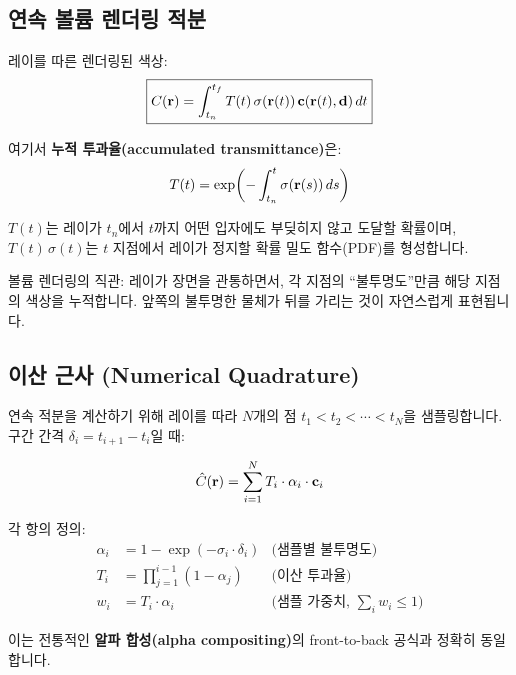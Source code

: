 \documentclass[11pt, a4paper]{report}
\begin{document}
\subsection{연속 볼륨 렌더링 적분}

레이를 따른 렌더링된 색상:
\begin{equation}
\boxed{
C(\mathbf{r}) = \int_{t_n}^{t_f} T(t)\, \sigma(\mathbf{r}(t))\, \mathbf{c}(\mathbf{r}(t), \mathbf{d})\, dt
}
\label{eq:volume_rendering}
\end{equation}

여기서 \textbf{누적 투과율(accumulated transmittance)}은:
\begin{equation}
T(t) = \exp\!\left( -\int_{t_n}^{t} \sigma(\mathbf{r}(s))\, ds \right)
\label{eq:transmittance}
\end{equation}

$T(t)$는 레이가 $t_n$에서 $t$까지 어떤 입자에도 부딪히지 않고 도달할 확률이며, $T(t)\,\sigma(t)$는 $t$ 지점에서 레이가 정지할 확률 밀도 함수(PDF)를 형성합니다.

\begin{keyidea}
볼륨 렌더링의 직관: 레이가 장면을 관통하면서, 각 지점의 ``불투명도''만큼 해당 지점의 색상을 누적합니다. 앞쪽의 불투명한 물체가 뒤를 가리는 것이 자연스럽게 표현됩니다.
\end{keyidea}

\subsection{이산 근사 (Numerical Quadrature)}

연속 적분을 계산하기 위해 레이를 따라 $N$개의 점 $t_1 < t_2 < \cdots < t_N$을 샘플링합니다. 구간 간격 $\delta_i = t_{i+1} - t_i$일 때:

\begin{equation}
\hat{C}(\mathbf{r}) = \sum_{i=1}^{N} T_i \cdot \alpha_i \cdot \mathbf{c}_i
\label{eq:discrete_rendering}
\end{equation}

각 항의 정의:
\begin{align}
\alpha_i &= 1 - \exp(-\sigma_i \cdot \delta_i) & \text{(샘플별 불투명도)} \label{eq:alpha} \\
T_i &= \prod_{j=1}^{i-1}(1 - \alpha_j) & \text{(이산 투과율)} \label{eq:discrete_T} \\
w_i &= T_i \cdot \alpha_i & \text{(샘플 가중치, $\sum_i w_i \leq 1$)} \label{eq:weight}
\end{align}

이는 전통적인 \textbf{알파 합성(alpha compositing)}의 front-to-back 공식과 정확히 동일합니다.
\end{document}
